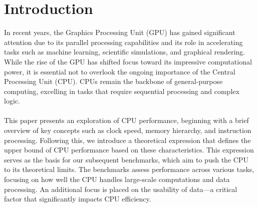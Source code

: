 \section{Introduction}
In recent years, the Graphics Processing Unit (GPU) has gained significant attention due to its parallel 
processing capabilities and its role in accelerating tasks such as machine learning, scientific 
simulations, and graphical rendering. While the rise of the GPU has shifted focus toward its impressive 
computational power, it is essential not to overlook the ongoing importance of the Central Processing 
Unit (CPU). CPUs remain the backbone of general-purpose computing, excelling in tasks that require 
sequential processing and complex logic.
\par

\paragraph*{}
This paper presents an exploration of CPU performance, beginning with a brief overview of key concepts such 
as clock speed, memory hierarchy, and instruction processing. Following this, we introduce a theoretical 
expression that defines the upper bound of CPU performance based on these characteristics. This expression 
serves as the basis for our subsequent benchmarks, which aim to push the CPU to its theoretical limits. 
The benchmarks assess performance across various tasks, focusing on how well the CPU handles large-scale 
computations and data processing. An additional focus is placed on the usability of data—a critical factor 
that significantly impacts CPU efficiency.
\par

\newpage